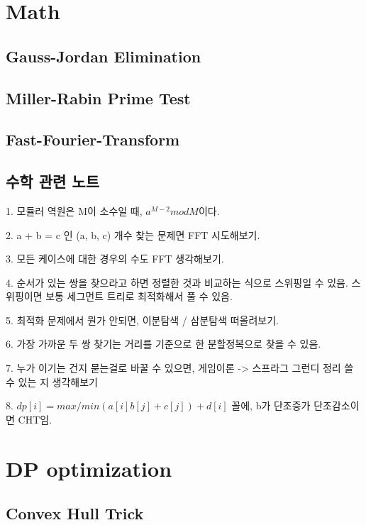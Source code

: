 \documentclass[10pt,landscape,a4paper,twocolumn]{article}
\begin{document}
\section{Math}

\subsection{Gauss-Jordan Elimination}


\subsection{Miller-Rabin Prime Test}


\subsection{Fast-Fourier-Transform}


\subsection{수학 관련 노트}
1. 모듈러 역원은 M이 소수일 때, $a^{M - 2} mod M$이다.


2. a + b = c 인 (a, b, c) 개수 찾는 문제면 FFT 시도해보기.


3. 모든 케이스에 대한 경우의 수도 FFT 생각해보기.


4. 순서가 있는 쌍을 찾으라고 하면 정렬한 것과 비교하는 식으로 스위핑일 수 있음. 스위핑이면 보통 세그먼트 트리로 최적화해서 풀 수 있음.


5. 최적화 문제에서 뭔가 안되면, 이분탐색 / 삼분탐색 떠올려보기.


6. 가장 가까운 두 쌍 찾기는 거리를 기준으로 한 분할정복으로 찾을 수 있음.


7. 누가 이기는 건지 묻는걸로 바꿀 수 있으면, 게임이론 -> 스프라그 그런디 정리 쓸 수 있는 지 생각해보기


8. $ dp[i] = max/min(a[i]b[j] + c[j]) + d[i]$ 꼴에, b가 단조증가 단조감소이면 CHT임.

\section{DP optimization}

\subsection{Convex Hull Trick}

\end{document}
